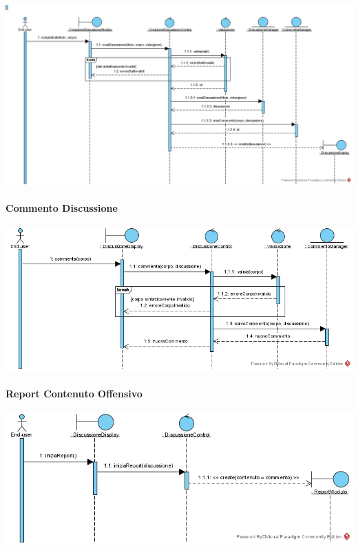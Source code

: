 \newpage
\begin{center}
\includegraphics[width=\textwidth,height=\textheight,keepaspectratio]{Figure/SequenceDiagrams/CreazioneDiscussioneInner.jpg}
\end{center}

\paragraph{Commento Discussione}
\begin{center}
\includegraphics[width=\textwidth,height=\textheight,keepaspectratio]{Figure/SequenceDiagrams/CommentoDiscussione.jpg}
\end{center}

\newpage
\paragraph{Report Contenuto Offensivo}
\begin{center}
\includegraphics[width=\textwidth,height=\textheight,keepaspectratio]{Figure/SequenceDiagrams/ReportContenutoOffensivoCommento.jpg}
\end{center}

